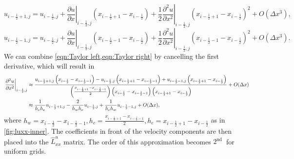 \documentclass{article}
\numberwithin{equation}{section}
\begin{document}
\begin{equation}\label{eqn:Taylor right} 
	u_{i-\frac{1}{2}+1,j}=u_{i-\frac{1}{2},j}+\left.\frac{\partial u}{\partial x}\right|_{i-\frac{1}{2},j}\left(x_{i-\frac{1}{2}+1}-x_{i-\frac{1}{2}}\right)+\frac{1}{2}\left.\frac{\partial^2 u}{\partial x^2}\right|_{i-\frac{1}{2},j}\left(x_{i-\frac{1}{2}+1}-x_{i-\frac{1}{2}}\right)^2+O\left(\Delta x^3\right),
\end{equation}
\begin{equation}\label{eqn:Taylor left} 
	u_{i-\frac{1}{2}-1,j}=u_{i-\frac{1}{2},j}+\left.\frac{\partial u}{\partial x}\right|_{i-\frac{1}{2},j}\left(x_{i-\frac{1}{2}-1}-x_{i-\frac{1}{2}}\right)+\frac{1}{2}\left.\frac{\partial^2 u}{\partial x^2}\right|_{i-\frac{1}{2},j}\left(x_{i-\frac{1}{2}-1}-x_{i-\frac{1}{2}}\right)^2+O\left(\Delta x^3\right).
\end{equation}
We can combine \cref{eqn:Taylor left,eqn:Taylor right} by cancelling the first derivative, which will result in
\begin{align}\label{eqn:laplacian-discretization-non-uniform-dx}
\left.\frac{\partial^2 u}{\partial x^2}\right|_{i-\frac{1}{2},j} & \approx \frac{u_{i-\frac{1}{2}+1,j}\left(x_{i-\frac{1}{2}}-x_{i-\frac{1}{2}-1}\right)-u_{i-\frac{1}{2},j}\left(x_{i-\frac{1}{2}+1}-x_{i-\frac{1}{2}-1}\right)+u_{i-\frac{1}{2}-1,j}\left(x_{i-\frac{1}{2}+1}-x_{i-\frac{1}{2}}\right)}{\left(\frac{x_{i-\frac{1}{2}+1}-x_{i-\frac{1}{2}-1}}{2}\right)\left(x_{i-\frac{1}{2}}-x_{i-\frac{1}{2}-1}\right)\left(x_{i-\frac{1}{2}+1}-x_{i-\frac{1}{2}}\right)}+O(\Delta x)\notag\\
& \approx \frac{1}{h_c h_e}u_{i-\frac{1}{2}+1,j} - \frac{2}{h_w h_e}u_{i-\frac{1}{2},j} + \frac{1}{h_c h_w}u_{i-\frac{1}{2}-1,j} + O(\Delta x),
\end{align}
where $h_w=x_{i-\frac{1}{2}}-x_{i-\frac{1}{2}-1},h_c = \frac{x_{i-\frac{1}{2}+1}-x_{i-\frac{1}{2}-1}}{2}, h_e = x_{i-\frac{1}{2}+1}-x_{i-\frac{1}{2}}$ as in \cref{fig:luxx-inner}. The coefficients in front of the velocity components are then placed into the $\hat{L}^u_{xx}$ matrix. The order of this approximation becomes $2^{\text {nd }}$ for uniform grids. 
\end{document}
